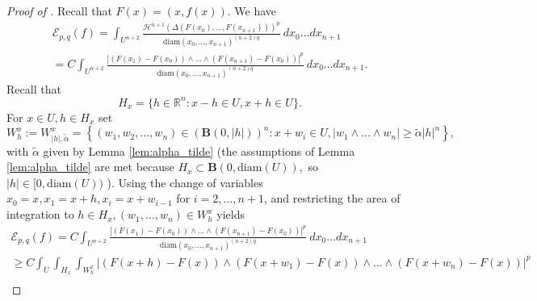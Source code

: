 \documentclass[11pt]{amsart}
\newcommand{\R}{\mathbb{R}}
\renewcommand{\H}{\mathscr{H}}
\newcommand{\diam}{\mathrm{diam}}
\newcommand{\Epq}{\mathcal{E}_{p,q}}
\theoremstyle{definition}
\begin{document}
	
	\begin{proof}[Proof of ]
		
		
%		
		Recall that $F(x)=(x,f(x))$. We have
		\begin{multline*}
		\Epq(f) = \int_{ U^{n+2}}\frac{\H^{n+1}(\Delta(F(x_0),\dots,F(x_{n+1})))^p}{\diam(x_0,\dots,x_{n+1})^{(n+2)q}}\ dx_0\dots dx_{n+1}\\
		= C\int_{ U^{n+2}}\frac{|(F(x_1)-F(x_0))\wedge\dots\wedge (F(x_{n+1})-F(x_{0}))|^p}{\diam(x_0,\dots,x_{n+1})^{(n+2)q}}\ dx_0\dots dx_{n+1}.
		\end{multline*}	
		Recall that
		\begin{equation*}
		H_x=\{h\in\R^n : x-h\in U, x+h\in U\}.
		\end{equation*}
		For $x\in U,h\in H_x$ set
		\begin{equation*}
		W^x_h:=W^x_{|h|,\tilde{\alpha}}=\left\{(w_1,w_2,\dots,w_{n})\in(\textbf{B}(0,|h|))^n : x+w_i\in U, |w_1\wedge\dots\wedge w_n|\geq \tilde{\alpha} |h|^n\right\},
		\end{equation*}
		with $\tilde{\alpha}$ given by Lemma \ref{lem:alpha_tilde} (the assumptions of Lemma \ref{lem:alpha_tilde} are met because $H_x\subset\textbf{B}(0,\diam( U)),$ so $|h|\in[0,\diam( U))$ ).
		Using the change of variables $x_0=x, x_1=x+h,x_i=x+w_{i-1}$ for $i=2,\dots,n+1$, and restricting the area of integration to $h\in H_x, (w_1,\dots,w_n)\in W_h^x$ yields 
		\begin{multline*}
		\Epq(f)= C\int_{ U^{n+2}}\frac{|(F(x_1)-F(x_0))\wedge\dots\wedge (F(x_{n+1})-F(x_{0}))|^p}{\diam(x_0,\dots,x_{n+1})^{(n+2)q}}\ dx_0\dots dx_{n+1}
		\\\geq C\int_{ U}\int_{H_x}\int_{W^x_h}|(F(x+h)-F(x))\wedge(F(x+w_1)-F(x))\wedge\dots\wedge (F(x+w_n)-F(x))|^p\\

\end{multline*}
\end{proof}
\end{document}
